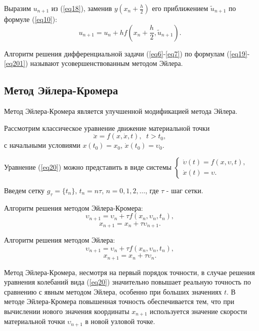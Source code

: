 \documentclass[
11pt,
master, %
subf, %
href, %
colorlinks=true, %
times, %
]{disser}
\begin{document}
Выразим $u_{n+1}$ из (\ref{eq18}), заменив $y\left(x_n + \frac{h}{2}\right)$ его приближением $\tilde{u}_{n+1}$ по формуле (\ref{eq10}):
\begin{equation}\label{eq201}
  u_{n+1} = u_n + hf\left(x_n + \frac{h}{2}, \tilde{u}_{n+1}\right).
\end{equation}

Алгоритм решения дифференциальной задачи (\ref{eq6}-\ref{eq7}) по формулам (\ref{eq19}-\ref{eq201}) называют усовершенствованным методом Эйлера.

\subsection{Метод Эйлера-Кромера}
Метод Эйлера-Кромера является улучшенной модификацией метода Эйлера.

Рассмотрим классическое уравнение движение материальной точки
\begin{equation}\label{eq20}
  \ddot{x} = f(x,\dot{x},t),\;\;t>t_0,
\end{equation}
с начальными условиями $x(t_0) = x_0$, $\dot{x}(t_0) = \upsilon_0$.

Уравнение (\ref{eq20}) можно представить в виде системы
$\left\{
  \begin{array}{ll}
    \dot{\upsilon}(t) = f(x,\upsilon,t),\\
    \dot{x}(t) = \upsilon.
  \end{array}
\right.$

Введем сетку $g_\tau = \{t_n\}$, $t_n = n\tau$, $n = 0,1,2,\ldots$, где $\tau$ - шаг сетки.

Алгоритм решения методом Эйлера-Кромера:
$$\upsilon_{n+1} = \upsilon_n + \tau f(x_n, \upsilon_n, t_n),$$
$$x_{n+1} = x_n + \tau \upsilon_{n+1}.$$

Алгоритм решения методом Эйлера:
$$\upsilon_{n+1} = \upsilon_n + \tau f(x_n, \upsilon_n, t_n),$$
$$x_{n+1} = x_n + \tau \upsilon_n.$$

Метод Эйлера-Кромера, несмотря на первый порядок точности, в случае решения уравнения колебаний вида (\ref{eq20}) значительно повышает реальную точность по сравнению с явным методом Эйлера, особенно при больших значениях $t$. В методе Эйлера-Кромера повышенная точность обеспечивается тем, что при вычислении нового значения координаты $x_{n+1}$ используется значение скорости материальной точки $\upsilon_{n+1}$ в новой узловой точке.
\end{document}
